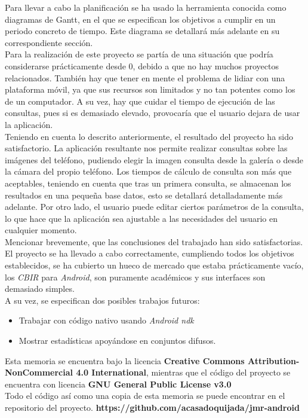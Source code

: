 Para llevar a cabo la planificación se ha usado la herramienta conocida como diagramas de Gantt, en el que se especifican los objetivos a cumplir en un periodo concreto de tiempo. Este diagrama se detallará más adelante en su correspondiente sección.\\

Para la realización de este proyecto se partía de una situación que podría considerarse prácticamente desde 0, debido a que no hay muchos proyectos relacionados. También hay que tener en mente el problema de lidiar con una plataforma móvil, ya que sus recursos son limitados y no tan potentes como los de un computador. A su vez, hay que cuidar el tiempo de ejecución de las consultas, pues si es demasiado elevado, provocaría que el usuario dejara de usar la aplicación.\\

Teniendo en cuenta lo descrito anteriormente, el resultado del proyecto ha sido satisfactorio. La aplicación resultante nos permite realizar consultas sobre las imágenes del teléfono, pudiendo elegir la imagen consulta desde la galería o desde la cámara del propio teléfono. Los tiempos de cálculo de consulta son más que aceptables, teniendo en cuenta que tras un primera consulta, se almacenan los resultados en una pequeña base datos, esto se detallará detalladamente más adelante. Por otro lado, el usuario puede editar ciertos parámetros de la consulta, lo que hace que la aplicación sea ajustable a las necesidades del usuario en cualquier momento.\\

Mencionar brevemente, que las conclusiones del trabajado han sido satisfactorias. El proyecto se ha llevado a cabo correctamente, cumpliendo todos los objetivos establecidos, se ha cubierto un hueco de mercado que estaba prácticamente vacío, los \textit{CBIR} para \textit{Android}, son puramente académicos y sus interfaces son demasiado simples.\\

A su vez, se especifican dos posibles trabajos futuros:

\begin{itemize}

\item Trabajar con código nativo usando \textit{Android ndk}

\item Mostrar estadísticas apoyándose en conjuntos difusos.

\end{itemize}


Esta memoria se encuentra bajo la licencia \textbf{Creative Commons Attribution-NonCommercial 4.0 International}, mientras que el código del proyecto se encuentra con licencia \textbf{GNU General Public License v3.0}\\

Todo el código así como una copia de esta memoria se puede encontrar en el repositorio del proyecto. \textbf{https://github.com/acasadoquijada/jmr-android}


